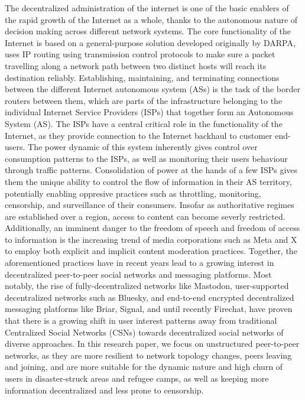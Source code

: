 The decentralized administration of the internet is one of the basic enablers of the rapid growth of the Internet as a whole, thanks to the autonomous nature of decision making across different network systems. The core functionality of the Internet is based on a general-purpose solution developed originally by DARPA, uses IP routing using transmission control protocols to make sure a packet travelling along a network path between two distinct hosts will reach its destination reliably.
Establishing, maintaining, and terminating connections between the different Internet autonomous system (ASs) is the task of the border routers between them, which are parts of the infrastructure belonging to the individual Internet Service Providers (ISPs) that together form an Autonomous System (AS).
The ISPs have a central critical role in the functionality of the Internet, as they provide connection to the Internet backhaul to customer end-users. The power dynamic of this system inherently gives control over consumption patterns to the ISPs, as well as monitoring their users behaviour through traffic patterns.
Consolidation of power at the hands of a few ISPs gives them the unique ability to control the flow of information in their AS territory, potentially enabling oppresive practices such as throttling, monitoring, censorship, and surveillance of their consumers. Insofar as authoritative regimes are established over a region, access to content can become severly restricted.
Additionally, an imminent danger to the freedom of speech and freedom of access to information is the increasing trend of media corporations such as Meta and X to employ both explicit and implicit content moderation practices.
Together, the aforementioned practices have in recent years lead to a growing interest in decentralized peer-to-peer social networks and messaging platforms. Most notably, the rise of fully-decentralized networks like Mastodon, user-supported decentralized networks such as Bluesky, and end-to-end encrypted decentralized messaging platforms like Briar, Signal, and until recently Firechat, have proven that there is a growing shift in user interest patterns away from traditional Centralized Social Networks (CSNs) towards decentralized social networks of diverse approaches. 
In this research paper, we focus on unstructured peer-to-peer networks, as they are more resilient to network topology changes, peers leaving and joining, and are more suitable for the dynamic nature and high churn of users in disaster-struck areas and refugee camps, as well as keeping more information decentralized and less prone to censorship.
